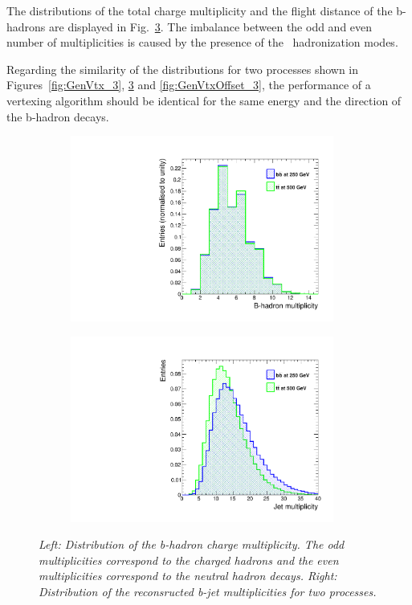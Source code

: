 The distributions of the total charge multiplicity and the flight distance of the b-hadrons are displayed in Fig.~\ref{fig:GenHadronParams_3}.
The imbalance between the odd and even number of multiplicities is caused by the presence of the \Bzs\ hadronization modes.

Regarding the similarity of the distributions for two processes shown in Figures~\ref{fig:GenVtx_3}, \ref{fig:GenHadronParams_3} and \ref{fig:GenVtxOffset_3}, the performance of a vertexing algorithm should be identical for the same energy and the direction of the b-hadron decays.


\begin{figure}
\centering
\begin{subfigure}{0.5\textwidth}
    \includegraphics[width=0.95\textwidth]{ILD/plots/gen-hadron-multiplicity.pdf}
\caption{\label{fig:GenHadronParams_a_3} }
\end{subfigure}%
  \begin{subfigure}{0.5\textwidth}
\centering
    \includegraphics[width=0.95\textwidth]{ILD/plots/jet-multi.pdf}
\caption{\label{fig:GenHadronParams_b_3} }
\end{subfigure}
    \caption{\sl Left: Distribution of the b-hadron charge multiplicity. The odd multiplicities correspond to the charged hadrons and the even multiplicities correspond to the neutral hadron decays. Right: Distribution of the reconsructed b-jet multiplicities for two processes. }
    \label{fig:GenHadronParams_3}
\end{figure}



